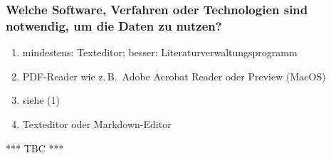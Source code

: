 \subsubsection{Welche Software, Verfahren oder Technologien sind notwendig, um die Daten zu nutzen?}

\begin{enumerate}[(1)]
  \item
    mindestens: Texteditor; besser: Literaturverwaltungsprogramm
  \item
    PDF-Reader wie z.\,B.\ Adobe Acrobat Reader oder Preview (MacOS)
  \item
    siehe (1)
  \item
    Texteditor oder Markdown-Editor
\end{enumerate}


*** TBC ***




